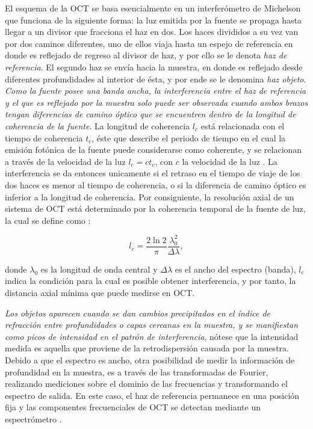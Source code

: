 El esquema de la OCT se basa esencialmente en un interferómetro de Michelson que funciona de la siguiente forma: la luz emitida por la fuente se propaga hasta llegar a un divisor que fracciona el haz en dos. Los haces divididos a su vez van por dos caminos diferentes, uno de ellos viaja hasta un espejo de referencia en donde es reflejado de regreso al divisor de haz, y por ello se le denota \textit{haz de referencia}. El segundo haz se envía hacia la muestra, en donde es reflejado desde diferentes profundidades al interior de ésta, y por ende se le denomina \textit{haz objeto}. \emph{Como la fuente posee una banda ancha, la interferencia entre el haz de referencia y el que es reflejado por la muestra solo puede ser observada cuando ambos brazos tengan diferencias de camino óptico que se encuentren dentro de la longitud de coherencia de la fuente}. La longitud de coherencia $l_c$ está relacionada con el tiempo de coherencia $t_c$, éste que describe el periodo de tiempo en el cual la emisión fotónica de la fuente puede considerarse como coherente, y se relacionan a través de la velocidad de la luz $l_c=ct_c$, con $c$ la velocidad de la luz \cite{Hecht2000}. La interferencia se da entonces unicamente si el retraso en el tiempo de viaje de los dos haces es menor al tiempo de coherencia, o si la diferencia de camino óptico es inferior a la longitud de coherencia. Por consiguiente, la resolución axial de un sistema de OCT está determinado por la coherencia temporal de la fuente de luz, la cual se define como \cite{Drexler2015}:


\begin{equation}
\label{eq:l_c}
l_c = \frac{2\ln 2}{\pi} \frac{\lambda_0^2}{\Delta \lambda},
\end{equation}

\noindent donde $\lambda_0$ es la longitud de onda central y $\Delta \lambda$ es el ancho del espectro (banda), $l_c$ indica la condición para la cual es posible obtener interferencia, y por tanto, la distancia axial mínima que puede medirse en OCT. 

\emph{Los objetos aparecen cuando se dan cambios precipitados en el índice de refracción entre profundidades o capas cercanas en la muestra, y se manifiestan como picos de intensidad en el patrón de interferencia}, nótese que la intensidad medida es aquella que proviene de la retrodispersión causada por la muestra. Debido a que el espectro es ancho, otra posibilidad de medir la información de profundidad en la muestra, es a través de las transformadas de Fourier, realizando mediciones sobre el dominio de las frecuencias y transformando el espectro de salida. En este caso, el haz de referencia permanece en una posición fija y las componentes frecuenciales de OCT se detectan mediante un espectrómetro \cite{Drexler2015,Brezinski2005}.

